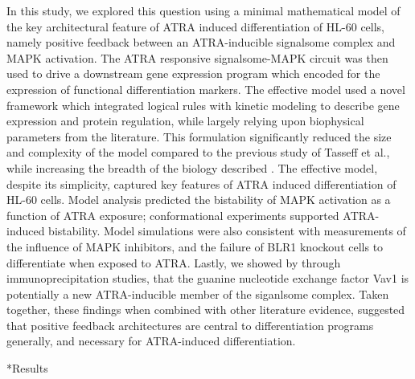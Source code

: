 \documentclass[12pt]{article}
\makeatletter
\renewcommand\section{\@startsection
	{subsection}{2}{0mm}
	{-0.2in}
	{0.05\baselineskip}
	{\normalfont\large\bfseries}}
\makeatother
\begin{document}
In this study, we explored this question using a minimal mathematical model of the key architectural feature of ATRA induced differentiation of HL-60 cells,
namely positive feedback between an ATRA-inducible signalsome complex and MAPK activation.
The ATRA responsive signalsome-MAPK circuit was then used to drive a downstream gene expression program which encoded for the expression of functional differentiation markers.
The effective model used a novel framework which integrated logical rules with kinetic modeling to describe gene expression and protein regulation,
while largely relying upon biophysical parameters from the literature.
This formulation significantly reduced the size and complexity of the model compared to the previous study of Tasseff et al., while increasing the breadth of the biology described \cite{Tasseff2011}.
The effective model, despite its simplicity, captured key features of ATRA induced differentiation of HL-60 cells.
Model analysis predicted the bistability of MAPK activation as a function of ATRA exposure; conformational experiments supported ATRA-induced bistability.
Model simulations were also consistent with measurements of the influence of MAPK inhibitors, and the failure of BLR1 knockout cells to differentiate when exposed to ATRA.
Lastly, we showed by through immunoprecipitation studies, that the guanine nucleotide exchange factor Vav1 is potentially a new ATRA-inducible member of the siganlsome complex.
Taken together, these findings when combined with other literature evidence,
suggested that positive feedback architectures are central to differentiation programs generally, and necessary for ATRA-induced differentiation.


\clearpage

\section*{Results}
\end{document}
